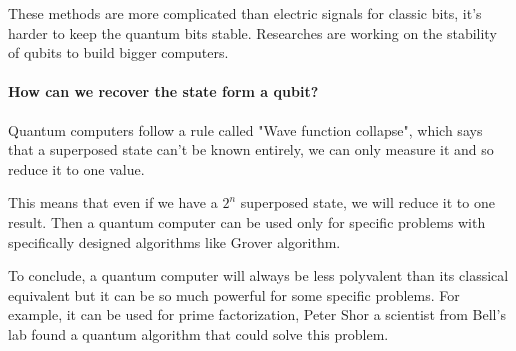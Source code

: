 These methods are more complicated than electric signals for classic bits, it's harder to keep the quantum bits stable. Researches are working on the stability of qubits to build bigger computers.

\paragraph{How can we recover the state form a qubit?}

Quantum computers follow a rule called "Wave function collapse", which says that a superposed state can't be known entirely, we can only measure it and so reduce it to one value.

This means that even if we have a $2^n$ superposed state, we will reduce it to one result. Then a quantum computer can be used only for specific problems with specifically designed algorithms like Grover algorithm. \newline

To conclude, a quantum computer will always be less polyvalent than its classical equivalent but it can be so much powerful for some specific problems. For example, it can be used for prime factorization, Peter Shor a scientist from Bell's lab found a quantum algorithm that could solve this problem. \newline
